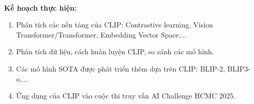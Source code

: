 \paragraph{}{\textbf{Kế hoạch thực hiện:}}

\begin{enumerate}
    \item Phân tích các nền tảng của CLIP: Contrastive learning, Vision Transformer/Transformer, Embedding Vector Space,...
    \item Phân tích dữ liệu, cách huấn luyện CLIP, so sánh các mô hình.
    \item Các mô hình SOTA được phát triển thêm dựa trên CLIP: BLIP-2, BLIP3-o,... 
    \item Ứng dụng của CLIP vào cuộc thi truy vấn AI Challenge HCMC 2025.
\end{enumerate}